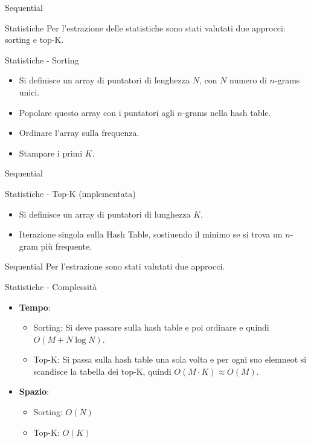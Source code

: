 \begin{frame}{Sequential}
    \begin{block}{Statistiche}
        Per l'estrazione delle statistiche sono stati valutati due approcci: sorting e top-K.
    \end{block}
    \begin{block}{Statistiche - Sorting}
        \begin{itemize}
            \item Si definisce un array di puntatori di lenghezza $N$, con $N$ numero di $n$-grams unici.
            \item Popolare questo array con i puntatori agli $n$-grams nella hash table.
            \item Ordinare l'array sulla frequenza.
            \item Stampare i primi $K$.
        \end{itemize}
    \end{block}
\end{frame}

\begin{frame}{Sequential}
    \begin{block}{Statistiche - Top-K (implementata)}
        \begin{itemize}
            \item Si definisce un array di puntatori di lunghezza $K$.
            \item Iterazione singola sulla Hash Table, sostiuendo il minimo se si trova un $n$-gram più frequente.
        \end{itemize}
    \end{block}
\end{frame}

\begin{frame}{Sequential}
    Per l'estrazione sono stati valutati due approcci.
    \begin{block}{Statistiche - Complessità}
        \begin{itemize}
            \item \textbf{Tempo}:
            \begin{itemize}
                \item Sorting: Si deve passare sulla hash table e poi ordinare e quindi $O(M + N\log N)$.
                \item Top-K: Si passa sulla hash table una sola volta e per ogni suo elemneot si scandisce la tabella dei top-K, quindi $O(M \cdot K)\approx O(M)$.
            \end{itemize}
            \item \textbf{Spazio}:
                        \begin{itemize}
                \item Sorting: $O(N)$
                \item Top-K: $O(K)$
            \end{itemize}
        \end{itemize}
    \end{block}
\end{frame}
